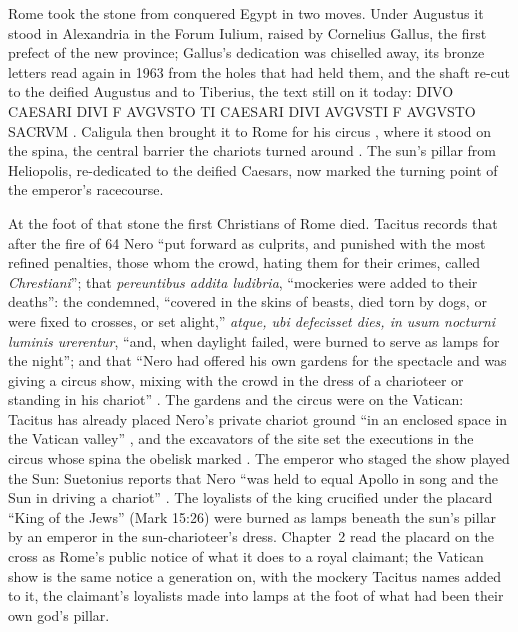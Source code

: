 Rome took the stone from conquered Egypt in two moves.
Under Augustus it stood in Alexandria in the Forum Iulium, raised by Cornelius Gallus, the first prefect of the new province; Gallus's dedication was chiselled away, its bronze letters read again in 1963 from the holes that had held them, and the shaft re-cut to the deified Augustus and to Tiberius, the text still on it today: DIVO CAESARI DIVI F AVGVSTO TI CAESARI DIVI AVGVSTI F AVGVSTO SACRVM \cite{iversen:obelisks-in-exile}.
Caligula then brought it to Rome for his circus \cite[36.74]{pliny:nh}, where it stood on the spina, the central barrier the chariots turned around \cite{iversen:obelisks-in-exile}.
The sun's pillar from Heliopolis, re-dedicated to the deified Caesars, now marked the turning point of the emperor's racecourse.

At the foot of that stone the first Christians of Rome died.
Tacitus records that after the fire of 64 Nero ``put forward as culprits, and punished with the most refined penalties, those whom the crowd, hating them for their crimes, called \emph{Chrestiani}''; that \emph{pereuntibus addita ludibria}, ``mockeries were added to their deaths'': the condemned, ``covered in the skins of beasts, died torn by dogs, or were fixed to crosses, or set alight,'' \emph{atque, ubi defecisset dies, in usum nocturni luminis urerentur}, ``and, when daylight failed, were burned to serve as lamps for the night''; and that ``Nero had offered his own gardens for the spectacle and was giving a circus show, mixing with the crowd in the dress of a charioteer or standing in his chariot'' \cite[15.44]{tacitus:annals}.
The gardens and the circus were on the Vatican: Tacitus has already placed Nero's private chariot ground ``in an enclosed space in the Vatican valley'' \cite[14.14]{tacitus:annals}, and the excavators of the site set the executions in the circus whose spina the obelisk marked \cite{toynbee:shrine-of-st-peter}.
The emperor who staged the show played the Sun: Suetonius reports that Nero ``was held to equal Apollo in song and the Sun in driving a chariot'' \cite[Nero 53]{suetonius:caesars}.
The loyalists of the king crucified under the placard ``King of the Jews'' (Mark 15:26) were burned as lamps beneath the sun's pillar by an emperor in the sun-charioteer's dress.
Chapter~2 read the placard on the cross as Rome's public notice of what it does to a royal claimant; the Vatican show is the same notice a generation on, with the mockery Tacitus names added to it, the claimant's loyalists made into lamps at the foot of what had been their own god's pillar.

